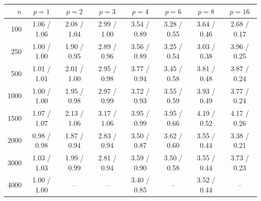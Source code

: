 \begin{tabular}{rccccccc}
\toprule
$n$ & $p{=}1$ & $p{=}2$ & $p{=}3$ & $p{=}4$ & $p{=}6$ & $p{=}8$ & $p{=}16$ \\
\midrule
100 & 1.06 / 1.06 & 2.08 / 1.04 & 2.99 / 1.00 & 3.54 / 0.89 & 3.28 / 0.55 & 3.64 / 0.46 & 2.68 / 0.17 \\
250 & 1.00 / 1.00 & 1.90 / 0.95 & 2.89 / 0.96 & 3.56 / 0.89 & 3.25 / 0.54 & 3.03 / 0.38 & 3.96 / 0.25 \\
500 & 1.01 / 1.01 & 2.01 / 1.00 & 2.95 / 0.98 & 3.77 / 0.94 & 3.45 / 0.58 & 3.81 / 0.48 & 3.87 / 0.24 \\
1000 & 1.00 / 1.00 & 1.95 / 0.98 & 2.97 / 0.99 & 3.72 / 0.93 & 3.55 / 0.59 & 3.93 / 0.49 & 3.77 / 0.24 \\
1500 & 1.07 / 1.07 & 2.13 / 1.06 & 3.17 / 1.06 & 3.95 / 0.99 & 3.95 / 0.66 & 4.19 / 0.52 & 4.17 / 0.26 \\
2000 & 0.98 / 0.98 & 1.87 / 0.94 & 2.83 / 0.94 & 3.50 / 0.87 & 3.62 / 0.60 & 3.55 / 0.44 & 3.38 / 0.21 \\
3000 & 1.03 / 1.03 & 1.99 / 0.99 & 2.81 / 0.94 & 3.59 / 0.90 & 3.50 / 0.58 & 3.55 / 0.44 & 3.73 / 0.23 \\
4000 & 1.00 / 1.00 & -- & -- & 3.40 / 0.85 & -- & 3.52 / 0.44 & -- \\
\bottomrule
\end{tabular}
